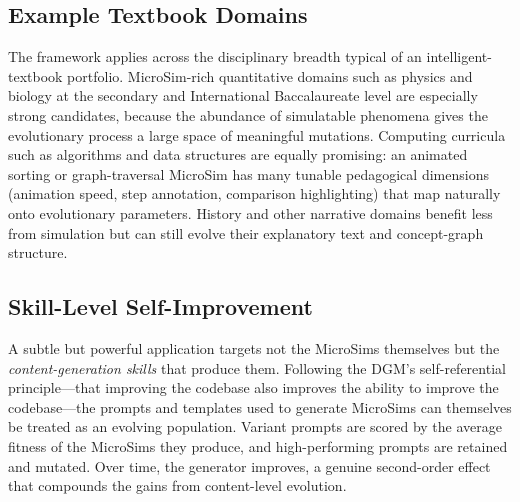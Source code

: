 \subsection{Example Textbook Domains}

The framework applies across the disciplinary breadth typical of an
intelligent-textbook portfolio. MicroSim-rich quantitative domains such as
physics and biology at the secondary and International Baccalaureate level are
especially strong candidates, because the abundance of simulatable phenomena
gives the evolutionary process a large space of meaningful mutations. Computing
curricula such as algorithms and data structures are equally promising: an
animated sorting or graph-traversal MicroSim has many tunable pedagogical
dimensions (animation speed, step annotation, comparison highlighting) that
map naturally onto evolutionary parameters. History and other narrative domains
benefit less from simulation but can still evolve their explanatory text and
concept-graph structure.

\subsection{Skill-Level Self-Improvement}

A subtle but powerful application targets not the MicroSims themselves but the
\textit{content-generation skills} that produce them. Following the DGM's
self-referential principle---that improving the codebase also improves the
ability to improve the codebase---the prompts and templates used to generate
MicroSims can themselves be treated as an evolving population. Variant prompts
are scored by the average fitness of the MicroSims they produce, and
high-performing prompts are retained and mutated. Over time, the generator
improves, a genuine second-order effect that compounds the gains from
content-level evolution.
